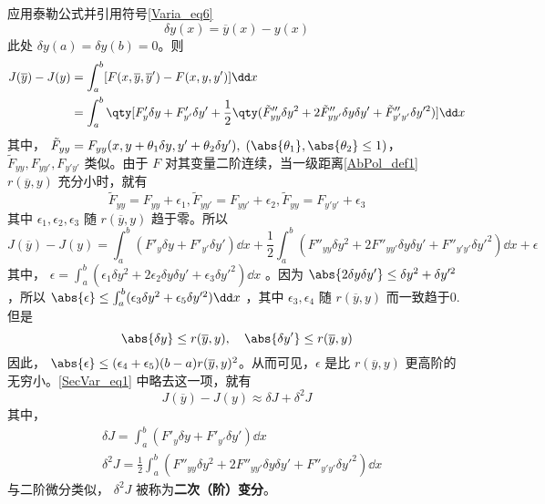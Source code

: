 应用泰勒公式并引用符号\autoref{Varia_eq6}~
\begin{equation}
\delta y(x)=\overline{y}(x)-y(x)
\end{equation}
此处 $\delta y(a)=\delta y(b)=0$。则
\begin{equation}
\begin{aligned}
J(\overline{y})-J(y)&=\int_a^b[F(x,\overline{y},\overline{y}')-F(x,y,y')]\dd x\\
&=\int_a^b\qty[F'_y\delta y+F'_{y'}\delta y'+\frac{1}{2}\qty(\tilde{F}''_{yy}\delta y^2+2\tilde{F}''_{yy'}\delta y\delta y'+\tilde{F}''_{y'y'}\delta y'^2)]\dd x
\end{aligned}
\end{equation}
其中， $\tilde{F}_{yy}=F_{yy}(x,y+\theta_1\delta y,y'+\theta_2\delta y'),\;(\abs{\theta_1},\abs{\theta_2}\leq1)$，$\tilde{F}_{yy},F_{yy'},F_{y'y'}$ 类似。由于 $F$ 对其变量二阶连续，当一级距离\autoref{AbPol_def1}~ $r(\overline{y},y)$ 充分小时，就有
\begin{equation}
\tilde F_{yy}=F_{yy}+\epsilon_1,\tilde F_{yy'}=F_{yy'}+\epsilon_2,\tilde F_{yy}=F_{y'y'}+\epsilon_3
\end{equation}
其中 $\epsilon_1,\epsilon_2,\epsilon_3$ 随 $r(\overline{y},y)$ 趋于零。所以
\begin{equation}\label{SecVar_eq1}
J(\overline{y})-J(y)=\int_a^b(F'_y\delta y+F'_{y'}\delta y')\dd x+\frac{1}{2}\int_a^b(F''_{yy}\delta y^2+2F''_{yy'}\delta y\delta y'+F''_{y'y'}\delta y'^2)\dd x+\epsilon
\end{equation}
其中， $\epsilon=\int_a^b(\epsilon_1\delta y^2+2\epsilon_2\delta y\delta y'+\epsilon_3\delta y'^2)\dd x$
。因为 $\abs{2\delta y\delta y'}\leq \delta y^2+\delta y'^2$，所以 $\abs{\epsilon}\leq \int_a^b(\epsilon_3\delta y^2+\epsilon_5\delta y'^2)\dd x$ ，其中 $\epsilon_3,\epsilon_4$ 随 $r(\overline{y},y)$ 而一致趋于0.但是
\begin{equation}
\abs{\delta y}\leq r(\overline{y},y),\quad \abs{\delta y'}\leq r(\overline{y},y)
\end{equation}
因此， $\abs{\epsilon}\leq (\epsilon_4+\epsilon_5)(b-a)r(\overline{y},y)^2$。从而可见，$\epsilon$ 是比 $r(\overline{y},y)$ 更高阶的无穷小。\autoref{SecVar_eq1} 中略去这一项，就有
\begin{equation}
J(\overline{y})-J(y)\approx\delta J+\delta^2J
\end{equation}
其中，
\begin{equation}
\begin{aligned}
&\delta J=\int_a^b(F'_y\delta y+F'_{y'}\delta y')\dd x\\
&\delta^2 J=\frac{1}{2}\int_a^b(F''_{yy}\delta y^2+2F''_{yy'}\delta y\delta y'+F''_{y'y'}\delta y'^2)\dd x
\end{aligned}
\end{equation}
与二阶微分类似， $\delta^2J$ 被称为\textbf{二次（阶）变分}。